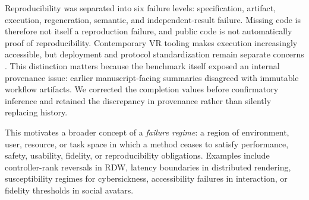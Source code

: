 Reproducibility was separated into six failure levels: specification, artifact, execution, regeneration, semantic, and independent-result failure. Missing code is therefore not itself a reproduction failure, and public code is not automatically proof of reproducibility. Contemporary VR tooling makes execution increasingly accessible, but deployment and protocol standardization remain separate concerns \cite{Hosseinzadeh2026VRToolboxes,OnlineVR2026}. This distinction matters because the benchmark itself exposed an internal provenance issue: earlier manuscript-facing summaries disagreed with immutable workflow artifacts. We corrected the completion values before confirmatory inference and retained the discrepancy in provenance rather than silently replacing history.

This motivates a broader concept of a \emph{failure regime}: a region of environment, user, resource, or task space in which a method ceases to satisfy performance, safety, usability, fidelity, or reproducibility obligations. Examples include controller-rank reversals in RDW, latency boundaries in distributed rendering, susceptibility regimes for cybersickness, accessibility failures in interaction, or fidelity thresholds in social avatars.
